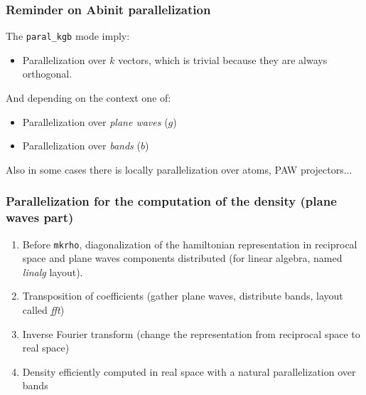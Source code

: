 \begin{frame}
  \frametitle{Reminder on Abinit parallelization}
  
  The \texttt{paral\_kgb} mode imply:
  \begin{itemize}
    \item Parallelization over $k$ vectors, which is trivial because
    they are always orthogonal.
  \end{itemize}

  And depending on the context one of:

  \begin{itemize}
    \item Parallelization over \emph{plane waves} ($g$)
    \item Parallelization over \emph{bands} ($b$)
  \end{itemize}
  Also in some cases there is locally parallelization over atoms, PAW projectors...
\end{frame}

\begin{frame}
  \frametitle{Parallelization for the computation of the density (plane waves part)}
  \begin{enumerate}
    \item Before \texttt{mkrho}, diagonalization of the hamiltonian \Rightarrow
      representation in reciprocal space and plane waves components distributed (for linear algebra, named \emph{linalg} layout).
    \item Transposition of coefficients (gather plane waves, distribute bands, layout called \emph{fft}) 
    \item Inverse Fourier transform (change the representation from reciprocal space to real space)
    \item Density efficiently computed in real space with a natural parallelization
      over bands 
  \end{enumerate}
  

\end{frame}

